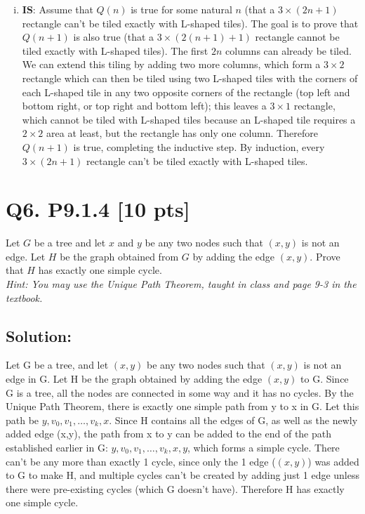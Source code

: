 \documentclass[12pt]{article}
\begin{document}
\begin{enumerate}[(a)]
\begin{enumerate}[(i)]
				\item \textbf{IS}: Assume that $Q(n)$ is true for some natural $n$ (that
					a $3\times(2n+1)$ rectangle can't be tiled exactly with L-shaped tiles).
					The goal is to prove that $Q(n+1)$ is also true (that a $3\times(2(n+1)
					+1)$ rectangle cannot be tiled exactly with L-shaped tiles). The first
					$2n$ columns can already be tiled. We can extend this tiling by adding
					two more columns, which form a $3\times2$ rectangle which can then be tiled
					using two L-shaped tiles with the corners of each L-shaped tile in any
					two opposite corners of the rectangle (top left and bottom right, or top
					right and bottom left); this leaves a $3\times1$ rectangle, which
					cannot be tiled with L-shaped tiles because an L-shaped tile requires
					a $2\times2$ area at least, but the rectangle has only one column.
					Therefore $Q(n+1)$ is true, completing the inductive step. By
					induction, every $3\times(2n+1)$ rectangle can't be tiled exactly with
					L-shaped tiles.
			\end{enumerate}
	\end{enumerate}

	\newpage

	\section*{\textbf{Q6. P9.1.4} [10 pts]}
	Let $G$ be a tree and let $x$ and $y$ be any two nodes such that $(x, y)$ is not
	an edge. Let $H$ be the graph obtained from $G$ by adding the edge $(x, y)$. Prove
	that $H$ has exactly one simple cycle. \\

	\noindent
	\textit{Hint: You may use the Unique Path Theorem, taught in class and page 9-3
	in the textbook.}

	\medskip

	\subsection*{\textbf{Solution:}}

	Let G be a tree, and let $(x,y)$ be any two nodes such that $(x,y)$ is not an
	edge in G. Let H be the graph obtained by adding the edge $(x,y)$ to G. Since
	G is a tree, all the nodes are connected in some way and it has no cycles. By
	the Unique Path Theorem, there is exactly one simple path from y to x in G.
	Let this path be $y,v_{0},v_{1},\ldots,v_{k},x$. Since H contains all the edges
	of G, as well as the newly added edge (x,y), the path from x to y can be added
	to the end of the path established earlier in G:
	$y,v_{0},v_{1},\ldots,v_{k},x,y$, which forms a simple cycle. There can't be
	any more than exactly 1 cycle, since only the 1 edge ($(x,y)$) was added to G to
	make H, and multiple cycles can't be created by adding just 1 edge unless
	there were pre-existing cycles (which G doesn't have). Therefore H has exactly
	one simple cycle.
\end{document}
